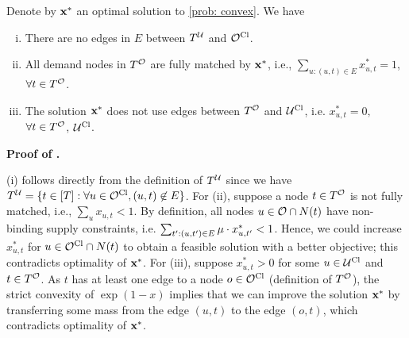 {\begin{proposition}
    \label{cor: two-stage corollary}
    Denote by $\mathbf{x}^*$ an optimal solution to \ref{prob: convex}. We have
    \begin{enumerate}[(i)]
        \item There are no edges in $E$ between $T^\mathcal U$ and $\mathcal O^{\mathrm{Cl}}$.
        \item All demand nodes in $T^\mathcal O$ are fully matched by $\mathbf{x}^*$, i.e., $\sum_{u: (u,t) \in E} x_{u,t}^* = 1$, $\forall t \in T^\mathcal O$.
        \item The solution $\mathbf{x}^*$ does not use edges between $T^{\mathcal O}$ and $\mathcal U^{\mathrm{Cl}}$, i.e. $x^*_{u,t} = 0,$ $\forall t \in T^{\mathcal O}$, $\mathcal U^{\mathrm{Cl}}$.
    \end{enumerate}
\end{proposition}

\noindent \textbf{Proof of .} {(i) follows directly from the definition of $T^\mathcal U$ since we have $T^{\mathcal U}=\{ t \in [T]: \forall u \in \mathcal O^{\mathrm{Cl}}, (u,t) \not\in E \}$. For (ii), suppose a node $t \in T^\mathcal O$ is not fully matched, i.e., $\sum_u x_{u,t}<1$. By definition, all  nodes $u \in \mathcal O \cap N(t)$ have non-binding supply constraints, i.e. $\sum_{t':(u,t') \in E} \mu \cdot x_{u,t'}^* < 1$. Hence, we could increase $x^*_{u,t}$ for $u \in \mathcal O^{\mathrm{Cl}}\cap N(t)$ to obtain a feasible solution with a better objective; this contradicts optimality of $\mathbf{x}^*$. For (iii), suppose $x^*_{u,t} > 0$ for some $u \in \mathcal U^{\mathrm{Cl}}$ and $t \in T^\mathcal O$. As $t$ has at least one edge to a node $o \in \mathcal O^{\mathrm{Cl}}$ (definition of $T^\mathcal O$), the strict convexity of $\exp(1-x)$ implies that we can  improve the solution $\mathbf{x}^*$ by transferring some mass from the edge $(u, t)$ to the edge $(o, t)$, which contradicts optimality of $\mathbf{x}^*$. \hfill\Halmos
        
}}
